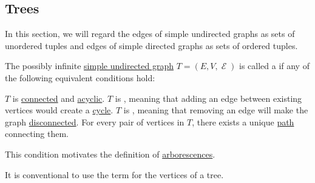 \subsection{Trees}\label{subsec:trees}

In this section, we will regard the edges of simple undirected graphs as sets of unordered tuples and edges of simple directed graphs as sets of ordered tuples.

\begin{definition}\label{def:tree}
  The possibly infinite \hyperref[def:undirected_multigraph]{simple undirected graph} \( T= (E, V, \mscrE) \) is called a  if any of the following equivalent conditions hold:
  \begin{thmenum}
     \( T \) is \hyperref[def:undirected_multigraph_connectedness]{connected} and \hyperref[def:undirected_multigraph_path/cycle]{acyclic}.
     \( T \) is , meaning that adding an edge between existing vertices would create a \hyperref[def:undirected_multigraph_path/cycle]{cycle}.
     \( T \) is , meaning that removing an edge will make the graph \hyperref[def:quiver_connectedness]{disconnected}.
     For every pair of vertices in \( T \), there exists a unique \hyperref[def:quiver_path]{path} connecting them.

    This condition motivates the definition of \hyperref[def:arborescence]{arborescences}.
  \end{thmenum}

  It is conventional to use the term  for the vertices of a tree.
\end{definition}
